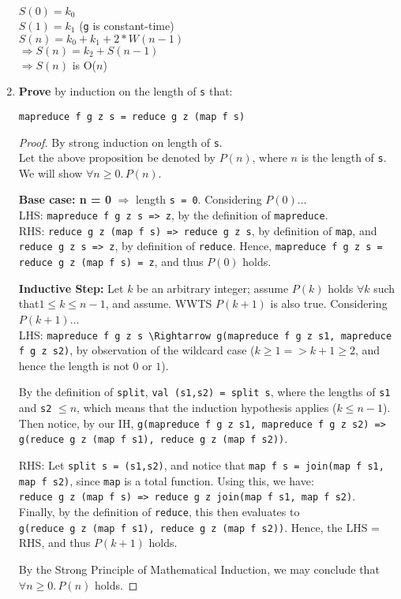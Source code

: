 \documentclass[11pt]{article}
\begin{document}
\begin{enumerate}
$S(0) = k_0$\\
$S(1) = k_1$ (\verb|g| is constant-time)\\
$S(n) = k_0 + k_1 + 2*W(n-1)$\\
$\Rightarrow S(n) = k_2 + S(n-1)$\\
$\Rightarrow S(n)$ is O($n$)
\item \textbf{Prove} by induction on the length of \verb|s| that:
\begin{center}\verb|mapreduce f g z s = reduce g z (map f s)|\end{center}
\begin{proof} By strong induction on length of \verb|s|.\\
Let the above proposition be denoted by $P(n)$, where $n$ is the length of \verb|s|.  We will show $\forall n \geq 0.\, P(n)$.

\textbf{Base case: n = 0}  $\Rightarrow$ length \verb|s = 0|.  Considering $P(0)$...\\
LHS:   \verb|mapreduce f g z s => z|, by the definition of \verb|mapreduce|.\\
RHS:   \verb|reduce g z (map f s) => reduce g z s|, by definition of \verb|map|, and \verb|reduce g z s => z|, by definition of \verb|reduce|.  Hence, \verb|mapreduce f g z s = reduce g z (map f s) = z|, and thus $P(0)$ holds.

\textbf{Inductive Step:}  Let $k$ be an arbitrary integer; assume $P(k)$ holds $\forall k$ such that$1 \leq k \leq n-1$, and assume.  WWTS $P(k+1)$ is also true.  Considering $P(k+1)$...\\
LHS:  \verb|mapreduce f g z s \Rightarrow g(mapreduce f g z s1, mapreduce f g z s2)|, by observation of the wildcard case ($k \geq 1 => k+1 \geq 2$, and hence the length is not $0$ or $1$).

By the definition of \verb|split|, \verb|val (s1,s2) = split s|, where the lengths of \verb|s1| and \verb|s2| $\leq n$, which means that the induction hypothesis applies ($k \leq n-1$).  Then notice, by our IH, \verb|g(mapreduce f g z s1, mapreduce f g z s2) =>|\\
\verb|g(reduce g z (map f s1), reduce g z (map f s2))|.

RHS:  Let \verb|split s = (s1,s2)|, and notice that \verb|map f s = join(map f s1, map f s2)|, since \verb|map| is a total function.  Using this, we have:\\
\verb|reduce g z (map f s) => reduce g z join(map f s1, map f s2)|.\\
Finally, by the definition of \verb|reduce|, this then evaluates to\\
\verb|g(reduce g z (map f s1), reduce g z (map f s2))|.  Hence, the LHS = RHS, and thus $P(k+1)$ holds.

By the Strong Principle of Mathematical Induction, we may conclude that $\forall n \geq 0.\, P(n)$ holds.
\end{proof}
\end{enumerate}
\end{document}
